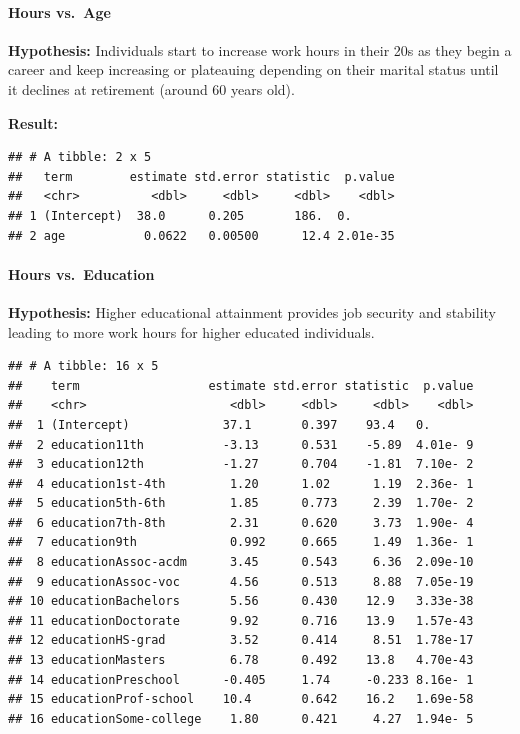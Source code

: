 \documentclass[]{article}
\let\oldparagraph\paragraph
\renewcommand{\paragraph}[1]{\oldparagraph{#1}\mbox{}}
\begin{document}
\hypertarget{hours-vs.-age}{%
\paragraph{Hours vs.~Age}\label{hours-vs.-age}}

\textbf{Hypothesis:} Individuals start to increase work hours in their
20s as they begin a career and keep increasing or plateauing depending
on their marital status until it declines at retirement (around 60 years
old).

\textbf{Result:}

\begin{verbatim}
## # A tibble: 2 x 5
##   term        estimate std.error statistic  p.value
##   <chr>          <dbl>     <dbl>     <dbl>    <dbl>
## 1 (Intercept)  38.0      0.205       186.  0.      
## 2 age           0.0622   0.00500      12.4 2.01e-35
\end{verbatim}

\hypertarget{hours-vs.-education}{%
\paragraph{Hours vs.~Education}\label{hours-vs.-education}}

\textbf{Hypothesis:} Higher educational attainment provides job security
and stability leading to more work hours for higher educated
individuals.

\begin{verbatim}
## # A tibble: 16 x 5
##    term                  estimate std.error statistic  p.value
##    <chr>                    <dbl>     <dbl>     <dbl>    <dbl>
##  1 (Intercept)             37.1       0.397    93.4   0.      
##  2 education11th           -3.13      0.531    -5.89  4.01e- 9
##  3 education12th           -1.27      0.704    -1.81  7.10e- 2
##  4 education1st-4th         1.20      1.02      1.19  2.36e- 1
##  5 education5th-6th         1.85      0.773     2.39  1.70e- 2
##  6 education7th-8th         2.31      0.620     3.73  1.90e- 4
##  7 education9th             0.992     0.665     1.49  1.36e- 1
##  8 educationAssoc-acdm      3.45      0.543     6.36  2.09e-10
##  9 educationAssoc-voc       4.56      0.513     8.88  7.05e-19
## 10 educationBachelors       5.56      0.430    12.9   3.33e-38
## 11 educationDoctorate       9.92      0.716    13.9   1.57e-43
## 12 educationHS-grad         3.52      0.414     8.51  1.78e-17
## 13 educationMasters         6.78      0.492    13.8   4.70e-43
## 14 educationPreschool      -0.405     1.74     -0.233 8.16e- 1
## 15 educationProf-school    10.4       0.642    16.2   1.69e-58
## 16 educationSome-college    1.80      0.421     4.27  1.94e- 5
\end{verbatim}
\end{document}
